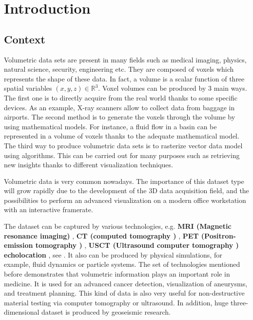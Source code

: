 
\chapter{Introduction} %

\label{Introduction} %


\newcommand{\keyword}[1]{\textbf{#1}}
\newcommand{\tabhead}[1]{\textbf{#1}}
\newcommand{\code}[1]{\texttt{#1}}
\newcommand{\file}[1]{\texttt{\bfseries#1}}
\newcommand{\option}[1]{\texttt{\itshape#1}}



\section{Context}

Volumetric data sets are present in many fields such as medical imaging, physics, natural science, security, engineering etc. They are composed of voxels which represents the shape of these data. In fact, a volume is a scalar function of three spatial variables $(x,y,z) \in \mathbb{R}^3$. Voxel volumes can be produced by 3 main ways. The first one is to directly acquire from the real world thanks to some specific devices. As an example, X-ray scanners allow to collect data from baggage in airports. The second method is to generate the voxels through the volume by using mathematical models. For instance, a fluid flow in a basin can be represented in a volume of voxels thanks to the adequate mathematical model. The third way to produce volumetric data sets is to  rasterize vector data model using algorithms. This can be carried out for many purposes such as retrieving new insights thanks to different visualization techniques.


Volumetric data is very common nowadays. The importance of this dataset type will grow rapidly due to the development of the 3D data acquisition field, and the possibilities to perform an advanced visualization on a modern office workstation with an interactive framerate.


The dataset can be captured by various technologies, e.g. \textbf{  MRI (Magnetic resonance imaging) } , \textbf{ CT (computed tomography ) }, \textbf{PET (Positron-emission tomography ) }, \textbf{ USCT (Ultrasound computer tomography ) echolocation }, see \cite{radiology} . It also can be produced by physical simulations, for example, fluid dynamics or particle systems. The set of technologies mentioned before demonstrates that volumetric information plays an important role in medicine. It is used for an advanced cancer detection, visualization of aneurysms, and treatment planning. This kind of data is also very useful for non-destructive material testing via computer tomography or ultrasound. In addition, huge three-dimensional dataset is produced by geoseismic research.


